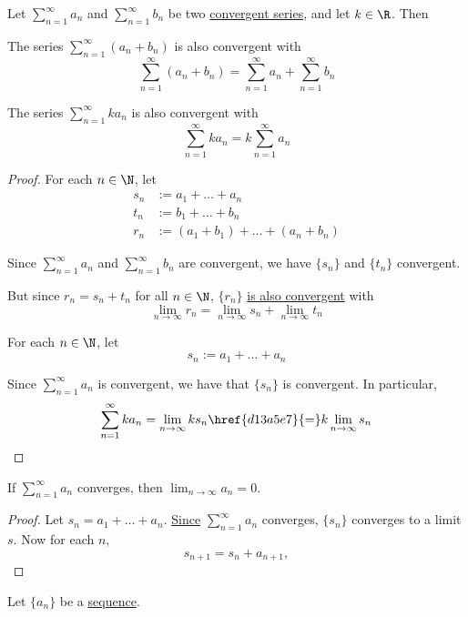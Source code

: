 Let $\displaystyle\sum_{n=1}^\infty a_n$ and $\displaystyle\sum_{n=1}^\infty
b_n$ be two \href{f8901df}{convergent series}, and let $k\in\R$. Then
\begin{enumerata}
  \item The series $\sum_{n=1}^\infty (a_n+b_n)$ is also convergent with
  $$
    \sum_{n=1}^\infty (a_n+b_n)=\sum_{n=1}^\infty a_n+\sum_{n=1}^\infty b_n
  $$
  \item The series $\sum_{n=1}^\infty ka_n$ is also convergent with
  $$
    \sum_{n=1}^\infty ka_n=k\sum_{n=1}^\infty a_n
  $$
\end{enumerata}

\begin{proof}
   For each $n\in\N$, let
  \begin{align*}
    s_n &:=a_1+\ldots+a_n             \\
    t_n &:=b_1+\ldots+b_n             \\
    r_n &:=(a_1+b_1)+\ldots+(a_n+b_n)
  \end{align*}

  Since $\sum_{n=1}^\infty a_n$ and $\sum_{n=1}^\infty b_n$ are convergent, we
  have $\{s_n\}$ and $\{t_n\}$ convergent.

  But since $r_n=s_n+t_n$ for all $n\in\N$, $\{r_n\}$ \href{d13a5e7}{is also
  convergent} with
  $$
    \lim_{n\to\infty}r_n=\lim_{n\to\infty}s_n+\lim_{n\to\infty}t_n
  $$

   For each $n\in\N$, let
  $$
    s_n:=a_1+\ldots+a_n
  $$

  Since $\sum_{n=1}^\infty a_n$ is convergent, we have that $\{s_n\}$ is
  convergent. In particular,
  $$
    \sum_{n=1}^\infty ka_n
    =\lim_{n\to\infty}ks_n
    \href{d13a5e7}{=}k\lim_{n\to\infty}s_n
  $$
\end{proof}

\label{a2ca7a8}

If $\sum_{n=1}^\infty a_n$ converges, then
$\displaystyle\lim_{n\to\infty}a_n=0$.

\begin{proof}
  Let $s_n=a_1+\ldots+a_n$. \href{f8901df}{Since} $\sum_{n=1}^\infty a_n$
  converges, $\{s_n\}$ converges to a limit $s$. Now for each $n$,
  $$
    s_{n+1}=s_n+a_{n+1},
  $$
\end{proof}

\label{fa993a6}

Let $\{a_n\}$ be a \href{b5fa0e4}{sequence}.

